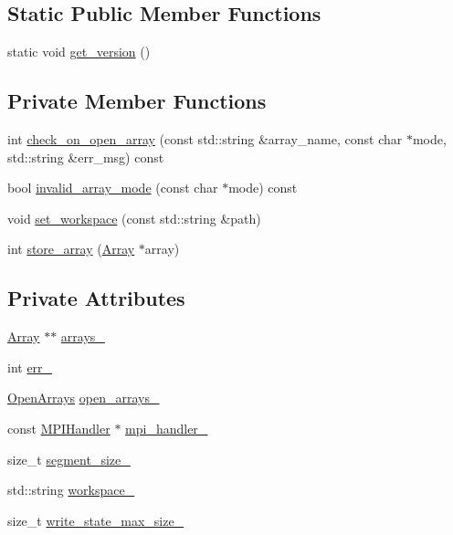 \subsection*{Static Public Member Functions}
\begin{DoxyCompactItemize}
\item 
static void \hyperlink{classStorageManager_a2cba3c99c6695df7d21836e75b806143}{get\+\_\+version} ()
\end{DoxyCompactItemize}
\subsection*{Private Member Functions}
\begin{DoxyCompactItemize}
\item 
int \hyperlink{classStorageManager_a3c61cd62233f323613e966932ddcc288}{check\+\_\+on\+\_\+open\+\_\+array} (const std\+::string \&array\+\_\+name, const char $\ast$mode, std\+::string \&err\+\_\+msg) const 
\item 
bool \hyperlink{classStorageManager_a4e99148b22ffc6d3c3220777188070d5}{invalid\+\_\+array\+\_\+mode} (const char $\ast$mode) const 
\item 
void \hyperlink{classStorageManager_ab14ee151d33680cbb03e1bec5a3f26dd}{set\+\_\+workspace} (const std\+::string \&path)
\item 
int \hyperlink{classStorageManager_a8823ffd11bf4a62ae08ab20bc2019b87}{store\+\_\+array} (\hyperlink{classArray}{Array} $\ast$array)
\end{DoxyCompactItemize}
\subsection*{Private Attributes}
\begin{DoxyCompactItemize}
\item 
\hyperlink{classArray}{Array} $\ast$$\ast$ \hyperlink{classStorageManager_a3d34312ce7468b1c708c8a3bc5e2ea08}{arrays\+\_\+}
\item 
int \hyperlink{classStorageManager_a3a36b5f640ef688962487bc1869b61e1}{err\+\_\+}
\item 
\hyperlink{classStorageManager_a029dfd29d09cbf61ea0c7151526d3924}{Open\+Arrays} \hyperlink{classStorageManager_a4f4d0447d153e3a33391d0663a63fdad}{open\+\_\+arrays\+\_\+}
\item 
const \hyperlink{classMPIHandler}{M\+P\+I\+Handler} $\ast$ \hyperlink{classStorageManager_af2070c85d3402bd1628d3d5fe7391c3e}{mpi\+\_\+handler\+\_\+}
\item 
size\+\_\+t \hyperlink{classStorageManager_ac1fa2414c2d99753a416eaa3e2794fdd}{segment\+\_\+size\+\_\+}
\item 
std\+::string \hyperlink{classStorageManager_a3ab615f83f9697bbd2dd4f9fbb79f81f}{workspace\+\_\+}
\item 
size\+\_\+t \hyperlink{classStorageManager_a70f86db65bc93b86d3bbcf46de12d4f3}{write\+\_\+state\+\_\+max\+\_\+size\+\_\+}
\end{DoxyCompactItemize}


